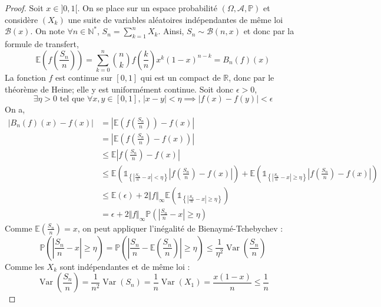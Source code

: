   \begin{proof}
    Soit $x \in ]0, 1[$. On se place sur un espace probabilité $(\Omega, \mathcal{A}, \mathbb{P})$ et considère $(X_k)$ une suite de variables aléatoires indépendantes de même loi $\mathcal{B}(x)$. On note $\forall n \in \mathbb{N}^*$, $S_n = \sum_{k=1}^n X_k$. Ainsi, $S_n \sim \mathcal{B}(n, x)$ et donc par la formule de transfert,
    \[ \mathbb{E} \left( f \left( \frac{S_n}{n} \right) \right) = \sum_{k=0}^n \binom{n}{k} f \left( \frac{k}{n} \right) x^k (1-x)^{n-k} = B_n(f)(x) \]
    La fonction $f$ est continue sur $[0,1]$ qui est un compact de $\mathbb{R}$, donc par le théorème de Heine; elle y est uniformément continue. Soit donc $\epsilon > 0$,
    \[ \exists \eta > 0 \text{ tel que } \forall x, y \in [0,1], \, |x-y| < \eta \implies |f(x) - f(y)| < \epsilon \]
    On a,
    \begin{align*}
      |B_n(f)(x) - f(x)| &= \left| \mathbb{E} \left( f \left( \frac{S_n}{n} \right) \right) - f(x) \right| \\
      &= \left| \mathbb{E} \left( f \left( \frac{S_n}{n} \right) - f(x) \right) \right| \\
      &\leq \mathbb{E} \left| f \left( \frac{S_n}{n} \right) - f(x) \right| \\
      &\leq \mathbb{E} \left( \mathbb{1}_{\left \{ \left| \frac{S_n}{n} - x \right| < \eta \right \}} \left| f \left( \frac{S_n}{n} \right) - f(x) \right| \right) + \mathbb{E} \left( \mathbb{1}_{\left \{ \left| \frac{S_n}{n} - x \right| \geq \eta \right \}} \left| f \left( \frac{S_n}{n} \right) - f(x) \right| \right) \\
      &\leq \mathbb{E} (\epsilon) + 2 \Vert f \Vert_\infty \mathbb{E} \left( \mathbb{1}_{\left \{ \left| \frac{S_n}{n} - x \right| \geq \eta \right \}} \right) \\
      &= \epsilon + 2 \Vert f \Vert_\infty \mathbb{P} \left( \left| \frac{S_n}{n} - x \right| \geq \eta \right) \tag{$*$}
    \end{align*}
    Comme $\mathbb{E} \left( \frac{S_n}{n} \right) = x$, on peut appliquer l'inégalité de Bienaymé-Tchebychev :
    \[ \mathbb{P} \left( \left| \frac{S_n}{n} - x \right| \geq \eta \right) = \mathbb{P} \left( \left| \frac{S_n}{n} - \mathbb{E} \left( \frac{S_n}{n} \right) \right| \geq \eta \right) \leq \frac{1}{\eta^2} \operatorname{Var} \left( \frac{S_n}{n} \right) \]
    Comme les $X_k$ sont indépendantes et de même loi :
    \[ \operatorname{Var} \left( \frac{S_n}{n} \right) = \frac{1}{n^2} \operatorname{Var} (S_n) = \frac{1}{n} \operatorname{Var}(X_1) = \frac{x(1-x)}{n} \leq \frac{1}{n} \]

\end{proof}
